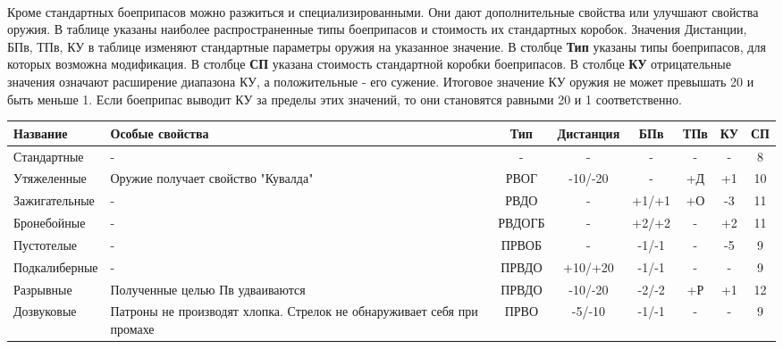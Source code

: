 \paragraph{} Кроме стандартных боеприпасов можно разжиться и специализированными. Они дают дополнительные свойства или улучшают свойства оружия. В таблице указаны наиболее распространенные типы боеприпасов и стоимость их стандартных коробок. Значения Дистанции, БПв, ТПв, КУ в таблице изменяют стандартные параметры оружия на указанное значение. 
\newline В столбце \textbf{Тип} указаны типы боеприпасов, для которых возможна модификация.
\newline В столбце \textbf{СП} указана стоимость стандартной коробки боеприпасов. 
\newline В столбце \textbf{КУ} отрицательные значения означают расширение диапазона КУ, а положительные - его сужение. Итоговое значение КУ оружия не может превышать 20 и быть меньше 1. Если боеприпас выводит КУ за пределы этих значений, то они становятся равными 20 и 1 соответственно. 

\begin{longtable}{|p{3cm}|p{2.5cm}|c||c|c|c|c||c|}\hline
Название & Особые свойства & Тип & Дистанция & БПв & ТПв & КУ & СП\\ \hline
Стандартные & - & - & - & - & - & - & 8\\ \hline
Утяжеленные & Оружие получает свойство "Кувалда" & РВОГ & -10/-20 & - & +Д & +1 & 10\\ \hline
Зажигательные & - & РВДО & - & +1/+1 & +О & -3 & 11\\ \hline
Бронебойные & - & РВДОГБ & - & +2/+2 & - & +2 & 11\\ \hline
Пустотелые & - & ПРВОБ & - & -1/-1 & - & -5 & 9\\ \hline
Подкалиберные & - & ПРВДО & +10/+20 & -1/-1 & - & - & 9\\ \hline
Разрывные & Полученные целью Пв удваиваются & ПРВДО & -10/-20 & -2/-2 & +Р & +1 & 12\\ \hline
Дозвуковые & Патроны не производят хлопка. Стрелок не обнаруживает себя при промахе & ПРВО & -5/-10 & -1/-1 & - & - & 9\\ \hline
\end{longtable}
